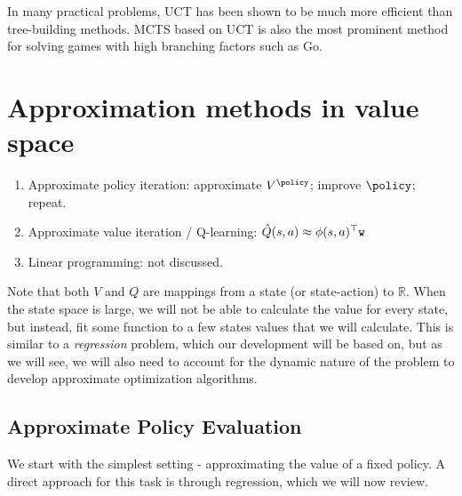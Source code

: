 In many practical problems, UCT has been shown to be much more efficient than tree-building methods. MCTS based on UCT is also the most prominent method for solving games with high branching factors such as Go. 

\section{Approximation methods in value space}
\begin{enumerate}
\item Approximate policy iteration: approximate $V^\policy$; improve $\policy$; repeat.
\item Approximate value iteration / Q-learning: $\hat{Q}(s,a)\approx {\phi}(s,a)^\top {\texttt{w}}$
\item Linear programming: not discussed.
\end{enumerate}

Note that both $V$ and $Q$ are mappings from a state (or state-action) to $\mathbb{R}$. When the state space is large, we will not be able to calculate the value for every state, but instead, fit some function to a few states values that we will calculate. This is similar to a \emph{regression} problem, which our development will be based on, but as we will see, we will also need to account for the dynamic nature of the problem to develop approximate optimization algorithms.

\subsection{Approximate Policy Evaluation}

We start with the simplest setting - approximating the value of a fixed policy. A direct approach for this task is through regression, which we will now review. 

